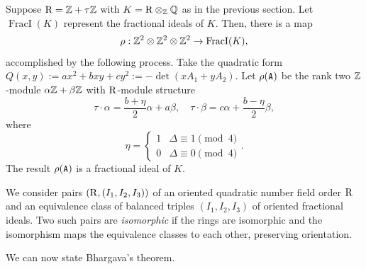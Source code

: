 Suppose $\mathrm{R} = \mathbb{Z} + \tau \mathbb{Z}$ with $K = \mathrm{R} \otimes_{\mathbb{Z}} \mathbb{Q}$ as in the previous section.  Let $\operatorname{FracI}(K)$ represent the fractional ideals of $K$.
Then, there is a map 
\[
	\rho: \mathbb{Z}^2 \otimes \mathbb{Z}^2 \otimes \mathbb{Z}^2 \rightarrow \operatorname{FracI}(K), 
\]
accomplished by the following process.  Take the quadratic form $Q(x,y) := ax^2 + bxy + cy^2 := -\det(xA_1 + yA_2)$.  Let $\rho(\mathtt{A})$ be the rank two $\mathbb{Z}$-module $\alpha \mathbb{Z} +  \beta \mathbb{Z}$ with $\mathrm{R}$-module structure
\[
\tau \cdot \alpha = \frac{b+\eta}{2} \alpha + a \beta, \quad
\tau \cdot \beta = c \alpha + \frac{b-\eta}{2} \beta,
\]
where
\[
\eta = \left\{ \begin{array}{ll}
1 & \Delta \equiv 1 \pmod{4} \\
0 & \Delta \equiv 0 \pmod{4}
\end{array} \right. .
\]
The result $\rho(\mathtt{A})$ is a fractional ideal of $K$.


We consider pairs $(\mathrm{R}, (I_1, I_2, I_3))$ of an oriented quadratic number field order $\mathrm{R}$ and an equivalence class of balanced triples $(I_1, I_2, I_3)$ of oriented fractional ideals.  Two such pairs are \emph{isomorphic} if the rings are isomorphic and the isomorphism maps the equivalence classes to each other, preserving orientation.  

We can now state Bhargava's theorem.

